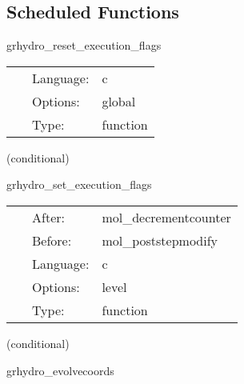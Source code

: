 \documentclass{article}
\begin{document}
\subsection*{Scheduled Functions}
\vspace{5mm}


\hspace{5mm} grhydro\_reset\_execution\_flags 

\hspace{5mm}{\it initially set execution flags to 'yeah, execute'! } 


\hspace{5mm}

 \begin{tabular*}{160mm}{cll} 
~ & Language:  & c \\ 
~ & Options:  & global \\ 
~ & Type:  & function \\ 
\end{tabular*} 


\vspace{5mm}

   (conditional) 

\hspace{5mm} grhydro\_set\_execution\_flags 

\hspace{5mm}{\it check if we need to execute rhs / post-step calculation } 


\hspace{5mm}

 \begin{tabular*}{160mm}{cll} 
~ & After:  & mol\_decrementcounter \\ 
~ & Before:  & mol\_poststepmodify \\ 
~ & Language:  & c \\ 
~ & Options:  & level \\ 
~ & Type:  & function \\ 
\end{tabular*} 


\vspace{5mm}

   (conditional) 

\hspace{5mm} grhydro\_evolvecoords 

\hspace{5mm}{\it evolve the coordinates for the comoving shift } 
\end{document}
